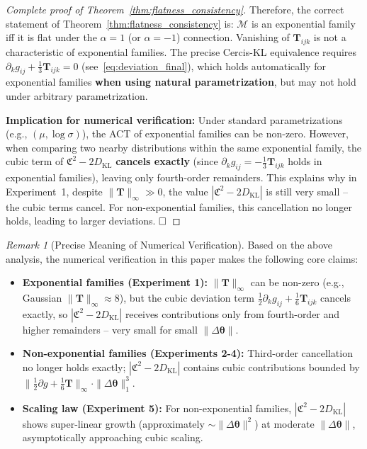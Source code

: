 \documentclass[12pt,a4paper]{article}
\theoremstyle{plain}
\theoremstyle{definition}
\theoremstyle{remark}
\newtheorem{remark}[theorem]{Remark}
\newcommand{\Cercis}{\textsf{Cercis}}
\newcommand{\MM}{\mathcal{M}}
\newcommand{\DKL}{D_{\mathrm{KL}}}
\newcommand{\CercisScore}{\mathfrak{C}}
\newcommand{\ACT}{\mathbf{T}}    %
\begin{document}
\begin{proof}[Complete proof of Theorem~\ref{thm:flatness_consistency}]
Therefore, the correct statement of Theorem~\ref{thm:flatness_consistency} is: $\MM$ is an exponential family iff it is flat under the $\alpha=1$ (or $\alpha=-1$) connection. Vanishing of $\ACT_{ijk}$ is not a characteristic of exponential families. The precise \Cercis-KL equivalence requires $\partial_k g_{ij} + \frac{1}{3}\ACT_{ijk} = 0$ (see~\eqref{eq:deviation_final}), which holds automatically for exponential families \textbf{when using natural parametrization}, but may not hold under arbitrary parametrization.

\textbf{Implication for numerical verification:} Under standard parametrizations (e.g., $(\mu, \log\sigma)$), the ACT of exponential families can be non-zero. However, when comparing two nearby distributions within the same exponential family, the cubic term of $\CercisScore^2 - 2\DKL$ \textbf{cancels exactly} (since $\partial_k g_{ij} = -\frac{1}{3}\ACT_{ijk}$ holds in exponential families), leaving only fourth-order remainders. This explains why in Experiment~1, despite $\|\ACT\|_{\infty} \gg 0$, the value $|\CercisScore^2 - 2\DKL|$ is still very small -- the cubic terms cancel. For non-exponential families, this cancellation no longer holds, leading to larger deviations. $\hfill\square$
\end{proof}

\begin{remark}[Precise Meaning of Numerical Verification]
Based on the above analysis, the numerical verification in this paper makes the following core claims:
\begin{itemize}
    \item \textbf{Exponential families (Experiment 1):} $\|\ACT\|_{\infty}$ can be non-zero (e.g., Gaussian $\|\ACT\|_{\infty} \approx 8$), but the cubic deviation term $\frac{1}{2}\partial_k g_{ij} + \frac{1}{6}\ACT_{ijk}$ cancels exactly, so $|\CercisScore^2 - 2\DKL|$ receives contributions only from fourth-order and higher remainders -- very small for small $\|\Delta\bm{\theta}\|$.
    \item \textbf{Non-exponential families (Experiments 2-4):} Third-order cancellation no longer holds exactly; $|\CercisScore^2 - 2\DKL|$ contains cubic contributions bounded by $\|\frac{1}{2}\partial g + \frac{1}{6}\ACT\|_{\infty} \cdot \|\Delta\bm{\theta}\|_1^3$.
    \item \textbf{Scaling law (Experiment 5):} For non-exponential families, $|\CercisScore^2 - 2\DKL|$ shows super-linear growth (approximately $\sim\|\Delta\bm{\theta}\|^2$) at moderate $\|\Delta\bm{\theta}\|$, asymptotically approaching cubic scaling.
\end{itemize}
\end{remark}
\end{document}
